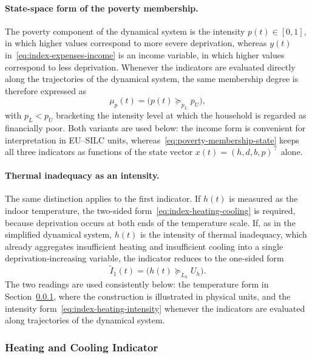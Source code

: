 \documentclass[11pt,a4paper]{article}
\begin{document}
\paragraph{State-space form of the poverty membership.}
The poverty component of the dynamical system is the intensity \(p(t)\in[0,1]\), in which higher values correspond to more severe deprivation, whereas \(y(t)\) in~\eqref{eq:index-expenses-income} is an income variable, in which higher values correspond to less deprivation. Whenever the indicators are evaluated directly along the trajectories of the dynamical system, the same membership degree is therefore expressed as
\begin{equation}\label{eq:poverty-membership-state}
\mu_p(t)=\bigl(p(t)\succeq_{p_L}p_U\bigr),
\end{equation}
with \(p_L<p_U\) bracketing the intensity level at which the household is regarded as financially poor. Both variants are used below: the income form is convenient for interpretation in EU--SILC units, whereas~\eqref{eq:poverty-membership-state} keeps all three indicators as functions of the state vector \(x(t)=(h,d,b,p)^\top\) alone.

\paragraph{Thermal inadequacy as an intensity.}
The same distinction applies to the first indicator. If \(h(t)\) is measured as the indoor temperature, the two-sided form~\eqref{eq:index-heating-cooling} is required, because deprivation occurs at both ends of the temperature scale. If, as in the simplified dynamical system, \(h(t)\) is the intensity of thermal inadequacy, which already aggregates insufficient heating and insufficient cooling into a single deprivation-increasing variable, the indicator reduces to the one-sided form
\begin{equation}\label{eq:index-heating-intensity}
\widetilde I_1(t)=\bigl(h(t)\succeq_{L_h}U_h\bigr).
\end{equation}
The two readings are used consistently below: the temperature form in Section~\ref{sec:heating-cooling}, where the construction is illustrated in physical units, and the intensity form~\eqref{eq:index-heating-intensity} whenever the indicators are evaluated along trajectories of the dynamical system.

\subsubsection{Heating and Cooling Indicator}\label{sec:heating-cooling}
\end{document}

